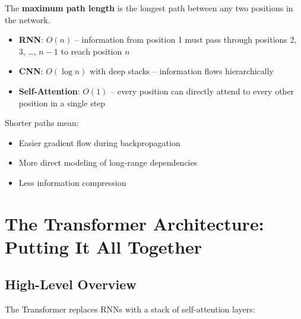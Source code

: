 \documentclass{article}
\begin{document}
The \textbf{maximum path length} is the longest path between any two positions in the network.

\begin{itemize}
\item \textbf{RNN}: $O(n)$ -- information from position 1 must pass through positions 2, 3, \ldots, $n-1$ to reach position $n$
\item \textbf{CNN}: $O(\log n)$ with deep stacks -- information flows hierarchically
\item \textbf{Self-Attention}: $O(1)$ -- every position can directly attend to every other position in a single step
\end{itemize}

Shorter paths mean:
\begin{itemize}
\item Easier gradient flow during backpropagation
\item More direct modeling of long-range dependencies
\item Less information compression
\end{itemize}

\section{The Transformer Architecture: Putting It All Together}

\subsection{High-Level Overview}

The Transformer replaces RNNs with a stack of self-attention layers:
\end{document}
